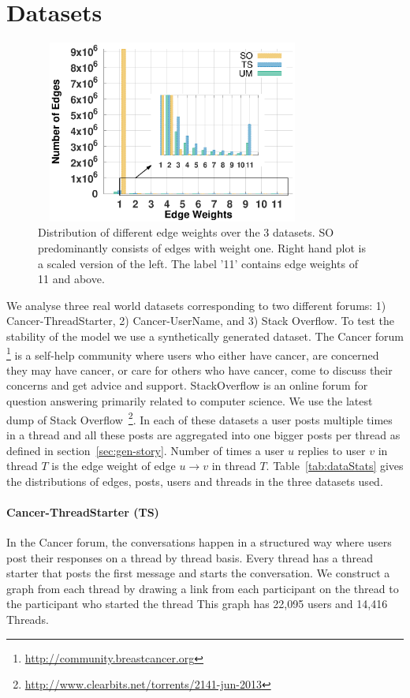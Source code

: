 \documentclass{sig-alternate}
\newcommand{\comment}[1]{\textcolor{red}{[#1]}}
\begin{document}
\section{Datasets}
\label{sec:dataset}

\begin{figure}
\begin{center}
\includegraphics[height=6cm,width=9cm]{figs/datastats.pdf}
\end{center}
\caption{\small{Distribution of different edge weights over the 3 datasets. SO 
predominantly consists of edges with weight one. Right hand plot is a scaled
version of the left. The label '11' contains edge weights of 11 and above.}}
\label{fig:EdgeDistribution}
\end{figure}
We analyse three real world datasets corresponding to two different forums: 1)
Cancer-ThreadStarter, 2) Cancer-UserName, and 3) Stack Overflow. To test the
stability of the model we use a synthetically generated dataset. 
The Cancer forum \footnote{\url{http://community.breastcancer.org}} 
is a self-help community where users who either have cancer, are 
concerned they may have cancer, or care for others who have cancer, 
come to discuss their concerns and get advice and support.
StackOverflow is an
online forum for question answering primarily related to computer science. We
use the latest dump of Stack
Overflow~\footnote{\url{http://www.clearbits.net/torrents/2141-jun-2013}}. In
each of these datasets a user posts multiple times in a thread and all these
posts are aggregated into one bigger posts per thread as defined in
section~\ref{sec:gen-story}.
Number of times a user $u$ replies to user $v$ in thread $T$ is the edge weight
of edge $u\rightarrow v$ in thread $T$.
Table~\ref{tab:dataStats} gives the distributions of edges, posts, users and
threads in the three datasets used. 
\vspace*{-0.5\baselineskip}
\paragraph{Cancer-ThreadStarter (TS)} In the Cancer forum, the conversations happen
in a structured way where users post their responses on a thread by thread
basis. Every thread has a thread starter that posts the first message and
starts the conversation. 
We construct a graph from each thread by drawing a link from each participant on 
the thread to the participant who started the thread
This graph has 22,095 users and 14,416 Threads. 
\vspace*{-0.5\baselineskip}
\end{document}
